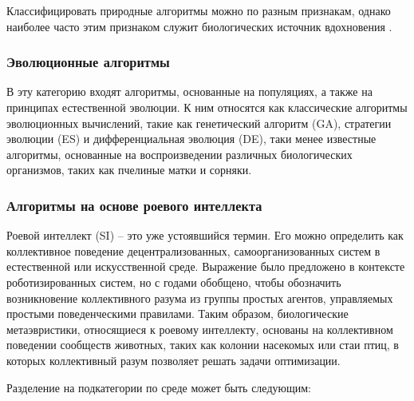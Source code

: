 Классифицировать природные алгоритмы можно по разным признакам, однако наиболее 
часто этим признаком служит биологических источник вдохновения \cite{BioInspiredTaxonomy}.

    \subsubsection{Эволюционные алгоритмы}
    
    В эту категорию входят алгоритмы, основанные на популяциях, а также 
    на принципах естественной эволюции. К ним относятся как 
    классические алгоритмы эволюционных вычислений, такие как генетический 
    алгоритм (GA), стратегии эволюции (ES) и дифференциальная эволюция (DE), 
    таки менее известные алгоритмы, основанные на воспроизведении 
    различных биологических организмов, таких как пчелиные матки и сорняки.

    \subsubsection{Алгоритмы на основе роевого интеллекта}

    Роевой интеллект (SI) -- это уже устоявшийся термин. Его можно определить 
    как коллективное поведение децентрализованных, самоорганизованных систем в 
    естественной или искусственной среде. Выражение было предложено в контексте 
    роботизированных систем, но с годами обобщено, чтобы обозначить возникновение 
    коллективного разума из группы простых агентов, управляемых простыми поведенческими 
    правилами. Таким образом, биологические метаэвристики, относящиеся к роевому 
    интеллекту, основаны на коллективном поведении сообществ животных, таких как 
    колонии насекомых или стаи птиц, в которых коллективный разум позволяет решать 
    задачи оптимизации.

    Разделение на подкатегории по среде может быть следующим:

